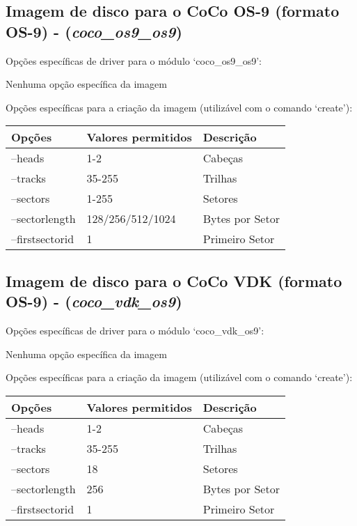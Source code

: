 \documentclass[letterpaper,10pt,brazil]{sphinxmanual}
\begin{document}
\subsection{Imagem de disco para o CoCo OS-9 (formato OS-9) - (\emph{coco\_os9\_os9})}
\label{tools/imgtool:imagem-de-disco-para-o-coco-os-9-formato-os-9-coco-os9-os9}
Opções específicas de driver para o módulo `coco\_os9\_os9':

Nenhuma opção específica da imagem

Opções específicas para a criação da imagem (utilizável com o comando `create'):

\noindent\begin{tabulary}{\linewidth}{|L|L|L|}
\hline

Opções
&
Valores permitidos
&
Descrição
\\
\hline
--heads
&
1-2
&
Cabeças
\\
\hline
--tracks
&
35-255
&
Trilhas
\\
\hline
--sectors
&
1-255
&
Setores
\\
\hline
--sectorlength
&
128/256/512/1024
&
Bytes por Setor
\\
\hline
--firstsectorid
&
1
&
Primeiro Setor
\\
\hline\end{tabulary}



\subsection{Imagem de disco para o CoCo VDK (formato OS-9) - (\emph{coco\_vdk\_os9})}
\label{tools/imgtool:imagem-de-disco-para-o-coco-vdk-formato-os-9-coco-vdk-os9}
Opções específicas de driver para o módulo `coco\_vdk\_os9':

Nenhuma opção específica da imagem

Opções específicas para a criação da imagem (utilizável com o comando `create'):

\noindent\begin{tabulary}{\linewidth}{|L|L|L|}
\hline

Opções
&
Valores permitidos
&
Descrição
\\
\hline
--heads
&
1-2
&
Cabeças
\\
\hline
--tracks
&
35-255
&
Trilhas
\\
\hline
--sectors
&
18
&
Setores
\\
\hline
--sectorlength
&
256
&
Bytes por Setor
\\
\hline
--firstsectorid
&
1
&
Primeiro Setor
\\
\hline\end{tabulary}
\end{document}
